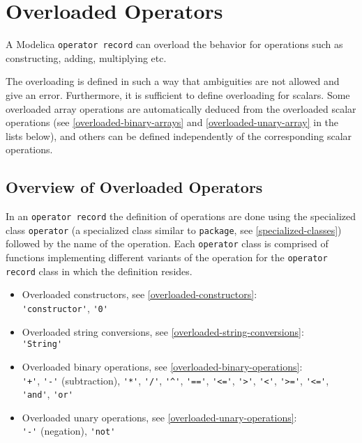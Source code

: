 \chapter{Overloaded Operators}\label{overloaded-operators}

A Modelica \lstinline!operator record! can overload the behavior for operations such as constructing, adding, multiplying etc.

The overloading is defined in such a way that ambiguities are not allowed and give an error.
Furthermore, it is sufficient to define overloading for scalars.
Some overloaded array operations are automatically deduced from the overloaded scalar operations (see \cref{overloaded-binary-arrays} and \cref{overloaded-unary-array} in the lists below), and others can be defined independently of the corresponding scalar operations.

\section{Overview of Overloaded Operators}\label{overview-of-overloaded-operators}

In an \lstinline!operator record! the definition of operations are done using the specialized class \lstinline!operator! (a specialized class similar to \lstinline!package!, see \cref{specialized-classes}) followed by the name of the operation.
Each \lstinline!operator! class is comprised of functions implementing different variants of the operation for the \lstinline!operator record! class in which the definition resides.
%
\begin{itemize}
\item Overloaded constructors, see \cref{overloaded-constructors}:\\ \lstinline!'constructor'!, \lstinline!'0'!
\item Overloaded string conversions, see \cref{overloaded-string-conversions}:\\ \lstinline!'String'!
\item Overloaded binary operations, see \cref{overloaded-binary-operations}:\\
  \lstinline!'+'!, \lstinline!'-'! (subtraction), \lstinline!'*'!, \lstinline!'/'!, \lstinline!'^'!,
  \lstinline!'=='!, \lstinline!'<='!, \lstinline!'>'!, \lstinline!'<'!,
  \lstinline!'>='!, \lstinline!'<='!, \lstinline!'and'!, \lstinline!'or'!
\item Overloaded unary operations, see \cref{overloaded-unary-operations}:\\
  \lstinline!'-'! (negation), \lstinline!'not'!
\end{itemize}

